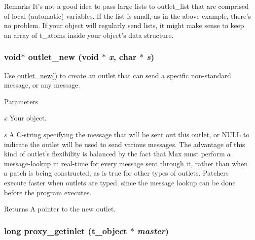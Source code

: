 \begin{DoxyRemark}{Remarks}
It’s not a good idea to pass large lists to outlet\_\-list that are comprised of local (automatic) variables. If the list is small, as in the above example, there’s no problem. If your object will regularly send lists, it might make sense to keep an array of t\_\-atoms inside your object’s data structure. 
\end{DoxyRemark}
\hypertarget{group__inout_ga451b3a1ec203ac8648a5399e209f070a}{
\subsubsection[{outlet\_\-new}]{\setlength{\rightskip}{0pt plus 5cm}void$\ast$ outlet\_\-new (void $\ast$ {\em x}, \/  char $\ast$ {\em s})}}
\label{group__inout_ga451b3a1ec203ac8648a5399e209f070a}


Use \hyperlink{group__inout_ga451b3a1ec203ac8648a5399e209f070a}{outlet\_\-new()} to create an outlet that can send a specific non-\/standard message, or any message. 
\begin{DoxyParams}{Parameters}
\item[{\em x}]Your object. \item[{\em s}]A C-\/string specifying the message that will be sent out this outlet, or NULL to indicate the outlet will be used to send various messages. The advantage of this kind of outlet’s flexibility is balanced by the fact that Max must perform a message-\/lookup in real-\/time for every message sent through it, rather than when a patch is being constructed, as is true for other types of outlets. Patchers execute faster when outlets are typed, since the message lookup can be done before the program executes. \end{DoxyParams}
\begin{DoxyReturn}{Returns}
A pointer to the new outlet. 
\end{DoxyReturn}
\hypertarget{group__inout_gae81f89a78389587dc23d641e38b42481}{
\subsubsection[{proxy\_\-getinlet}]{\setlength{\rightskip}{0pt plus 5cm}long proxy\_\-getinlet ({\bf t\_\-object} $\ast$ {\em master})}}
\label{group__inout_gae81f89a78389587dc23d641e38b42481}


